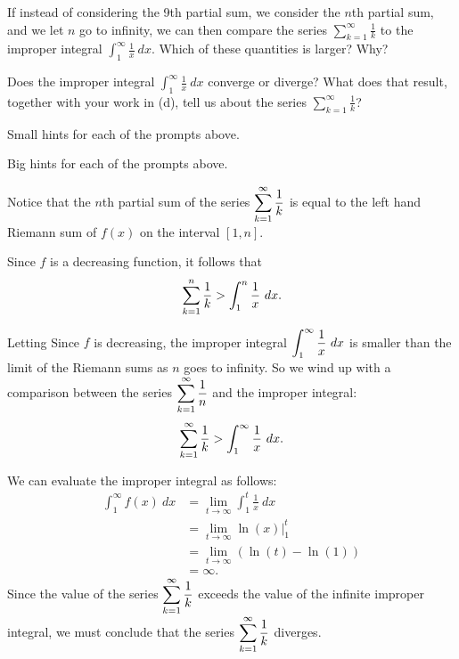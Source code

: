 \begin{activity}
\item If instead of considering the 9th partial sum, we consider the $n$th partial sum, and we let $n$ go to infinity, we can then compare the series $ \sum_{k=1}^{\infty} \frac{1}{k}$ to the improper integral $ \int_{1}^{\infty} \frac{1}{x} \ dx$.  Which of these quantities is larger?  Why?

\item Does the improper integral $ \int_{1}^{\infty} \frac{1}{x} \ dx$ converge or diverge? What does that result, together with your work in (d), tell us about the series $ \sum_{k=1}^{\infty} \frac{1}{k}$?

\ea
\end{activity}

\begin{smallhint}
\ba
	\item Small hints for each of the prompts above.
\ea
\end{smallhint}
\begin{bighint}
\ba
	\item Big hints for each of the prompts above.
\ea
\end{bighint}
\begin{activitySolution}
\ba
	\item Notice that the $n$th partial sum of the series $\displaystyle \sum_{k=1}^{\infty} \frac{1}{k}$ is equal to the left hand Riemann sum of $f(x)$ on the interval $[1,n]$.
    \item Since $f$ is a decreasing function, it follows that
\[\displaystyle \sum_{k=1}^{n} \frac{1}{k} > \int_{1}^{n} \frac{1}{x} \ dx.\]
    \item Letting Since $f$ is decreasing, the improper integral $\displaystyle \int_{1}^{\infty} \frac{1}{x} \ dx$ is smaller than the limit of the Riemann sums as $n$ goes to infinity. So  we wind up with a comparison between the series $\displaystyle \sum_{k=1}^{\infty} \frac{1}{n}$ and the improper integral:
\[\ds \sum_{k=1}^{\infty} \frac{1}{k} > \int_{1}^{\infty} \frac{1}{x} \ dx.\]
    \item We can evaluate the improper integral as follows:
\begin{align*}
\int_{1}^{\infty} f(x) \ dx &= \lim_{t \to \infty} \int_{1}^{t} \frac{1}{x} \ dx \\
    &= \lim_{t \to \infty} \ln(x) |_{1}^{t} \\
    &= \lim_{t \to \infty} \left(\ln(t) - \ln(1) \right) \\
    &= \infty.
\end{align*}
Since the value of the series $\displaystyle \sum_{k=1}^{\infty} \frac{1}{k}$ exceeds the value of the infinite improper integral, we must conclude that the series $\displaystyle \sum_{k=1}^{\infty} \frac{1}{k}$ diverges.
\ea
\end{activitySolution}
\aftera 
